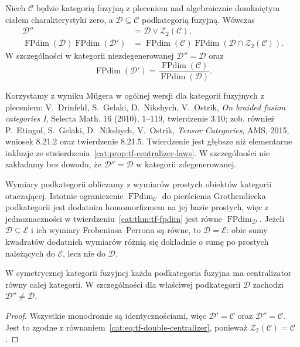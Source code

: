 \begin{twierdzenie}\label{cat:thm:tf-double-centralizer}
Niech $\mathcal C$ będzie kategorią fuzyjną z pleceniem nad algebraicznie domkniętym ciałem charakterystyki zero, a $\mathcal D\subseteq\mathcal C$ podkategorią fuzyjną. Wówczas
\begin{align}
 \mathcal D''&=\mathcal D\vee\mathcal Z_2(\mathcal C),
 \label{cat:eq:tf-double-centralizer}\\
 \operatorname{FPdim}(\mathcal D)\operatorname{FPdim}(\mathcal D')
 &=\operatorname{FPdim}(\mathcal C)
 \operatorname{FPdim}(\mathcal D\cap\mathcal Z_2(\mathcal C)).
 \label{cat:eq:tf-centralizer-dimension}
\end{align}
W szczególności w kategorii niezdegenerowanej $\mathcal D''=\mathcal D$ oraz
\[
 \operatorname{FPdim}(\mathcal D')=
 \frac{\operatorname{FPdim}(\mathcal C)}{\operatorname{FPdim}(\mathcal D)}.
\]
\end{twierdzenie}

Korzystamy z wyniku Mügera w ogólnej wersji dla kategorii fuzyjnych z pleceniem: V.~Drinfeld, S.~Gelaki, D.~Nikshych, V.~Ostrik, \emph{On braided fusion categories I}, Selecta Math. 16 (2010), 1--119, twierdzenie 3.10; zob. również P.~Etingof, S.~Gelaki, D.~Nikshych, V.~Ostrik, \emph{Tensor Categories}, AMS, 2015, wniosek 8.21.2 oraz twierdzenie 8.21.5. Twierdzenie jest głębsze niż elementarne inkluzje ze stwierdzenia~\ref{cat:prop:tf-centralizer-laws}. W szczególności nie zakładamy bez dowodu, że $\mathcal D''=\mathcal D$ w kategorii zdegenerowanej.

Wymiary podkategorii obliczamy z wymiarów prostych obiektów kategorii otaczającej. Istotnie ograniczenie $\operatorname{FPdim}_{\mathcal C}$ do pierścienia Grothendiecka podkategorii jest dodatnim homomorfizmem na jej bazie prostych, więc z jednoznaczności w twierdzeniu~\ref{cat:thm:tf-fpdim} jest równe $\operatorname{FPdim}_{\mathcal D}$. Jeżeli $\mathcal D\subseteq\mathcal E$ i ich wymiary Frobeniusa--Perrona są równe, to $\mathcal D=\mathcal E$: obie sumy kwadratów dodatnich wymiarów różnią się dokładnie o sumę po prostych należących do $\mathcal E$, lecz nie do $\mathcal D$.

\begin{wniosek}\label{cat:cor:tf-symmetric-centralizers}
W symetrycznej kategorii fuzyjnej każda podkategoria fuzyjna ma centralizator równy całej kategorii. W szczególności dla właściwej podkategorii $\mathcal D$ zachodzi $\mathcal D''\neq\mathcal D$.
\end{wniosek}
\begin{proof}
Wszystkie monodromie są identycznościami, więc $\mathcal D'=\mathcal C$ oraz $\mathcal D''=\mathcal C$. Jest to zgodne z równaniem~\eqref{cat:eq:tf-double-centralizer}, ponieważ $\mathcal Z_2(\mathcal C)=\mathcal C$.
\end{proof}

